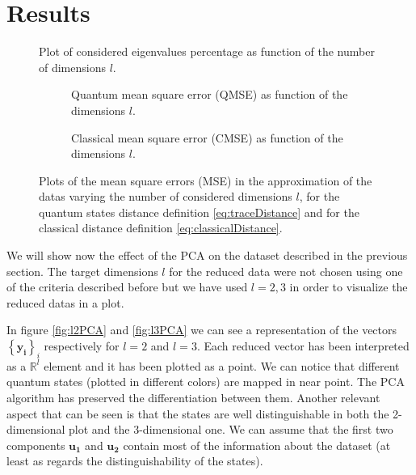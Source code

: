 \documentclass[%
    twoside, 
    a4paper
    ]{article}
\newcommand{\imagesPath}{./Images}
\begin{document}
\section{Results}
    \begin{figure}[t]
        \centering
        
        \caption{Plot of considered eigenvalues percentage as function of the number of 
        dimensions $l$.}
        \label{fig:eigenvaluesPlot}
    \end{figure}
    \begin{figure}[t]
        \centering
        \begin{subfigure}[t]{0.49\linewidth}
            
            \caption{Quantum mean square error (QMSE) as function of the dimensions $l$.}
        \label{fig:QMSE}
        \end{subfigure}
        \hfill
        \begin{subfigure}[t]{0.49\linewidth}
            
            \caption{Classical mean square error (CMSE) as function of the dimensions $l$.}
            \label{fig:CMSE}
        \end{subfigure}
        \caption{Plots of the mean square errors (MSE) in the approximation of the datas
        varying the number of considered dimensions $l$, for the quantum states distance definition
        \ref{eq:traceDistance} and for the classical distance definition \ref{eq:classicalDistance}.}
    \end{figure}
    We will show now the effect of the PCA on the dataset described in the previous 
    section.
    The target dimensions $l$ for the reduced data were not chosen using one of the criteria
    described before but we have used $l=2,3$ in order to visualize the reduced datas
    in a plot.

    In figure \ref{fig:l2PCA} and \ref{fig:l3PCA} we can see a representation of the
    vectors $\left\{\bm{y_i}\right\}_i$ respectively for $l=2$ and $l=3$.
    Each reduced vector has been interpreted as a $\mathbb{R}^l$ element and it has been
    plotted as a point.
    We can notice that different quantum states (plotted in different colors) are mapped
    in near point. The PCA algorithm has preserved the differentiation between them.
    Another relevant aspect that can be seen is that the states are well distinguishable
    in both the 2-dimensional plot and the 3-dimensional one. We can assume that the first two 
    components $\bm{u_1}$ and $\bm{u_2}$ contain most of the information about the dataset (at 
    least as regards the distinguishability of the states).
\end{document}
